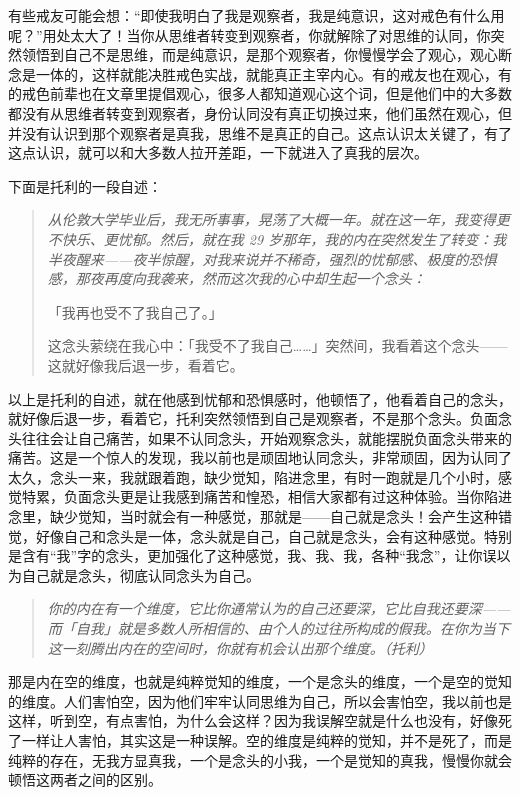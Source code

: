 有些戒友可能会想：“即使我明白了我是观察者，我是纯意识，这对戒色有什么用呢？”用处太大了！当你从思维者转变到观察者，你就解除了对思维的认同，你突然领悟到自己不是思维，而是纯意识，是那个观察者，你慢慢学会了观心，观心断念是一体的，这样就能决胜戒色实战，就能真正主宰内心。有的戒友也在观心，有的戒色前辈也在文章里提倡观心，很多人都知道观心这个词，但是他们中的大多数都没有从思维者转变到观察者，身份认同没有真正切换过来，他们虽然在观心，但并没有认识到那个观察者是真我，思维不是真正的自己。这点认识太关键了，有了这点认识，就可以和大多数人拉开差距，一下就进入了真我的层次。

下面是托利的一段自述：

\begin{quote}\it
    从伦敦大学毕业后，我无所事事，晃荡了大概一年。就在这一年，我变得更不快乐、更忧郁。然后，就在我 29 岁那年，我的内在突然发生了转变：我半夜醒来——夜半惊醒，对我来说并不稀奇，强烈的忧郁感、极度的恐惧感，那夜再度向我袭来，然而这次我的心中却生起一个念头：\begin{center}
        「我再也受不了我自己了。」
    \end{center} 这念头萦绕在我心中：「我受不了我自己……」突然间，我看着这个念头——这就好像我后退一步，看着它。
\end{quote}

以上是托利的自述，就在他感到忧郁和恐惧感时，他顿悟了，他看着自己的念头，就好像后退一步，看着它，托利突然领悟到自己是观察者，不是那个念头。负面念头往往会让自己痛苦，如果不认同念头，开始观察念头，就能摆脱负面念头带来的痛苦。这是一个惊人的发现，我以前也是顽固地认同念头，非常顽固，因为认同了太久，念头一来，我就跟着跑，缺少觉知，陷进念里，有时一跑就是几个小时，感觉特累，负面念头更是让我感到痛苦和惶恐，相信大家都有过这种体验。当你陷进念里，缺少觉知，当时就会有一种感觉，那就是——自己就是念头！会产生这种错觉，好像自己和念头是一体，念头就是自己，自己就是念头，会有这种感觉。特别是含有“我”字的念头，更加强化了这种感觉，我、我、我，各种“我念”，让你误以为自己就是念头，彻底认同念头为自己。

\begin{quote}\it
    你的内在有一个维度，它比你通常认为的自己还要深，它比自我还要深——而「自我」就是多数人所相信的、由个人的过往所构成的假我。在你为当下这一刻腾出内在的空间时，你就有机会认出那个维度。（托利）
\end{quote}

那是内在空的维度，也就是纯粹觉知的维度，一个是念头的维度，一个是空的觉知的维度。人们害怕空，因为他们牢牢认同思维为自己，所以会害怕空，我以前也是这样，听到空，有点害怕，为什么会这样？因为我误解空就是什么也没有，好像死了一样让人害怕，其实这是一种误解。空的维度是纯粹的觉知，并不是死了，而是纯粹的存在，无我方显真我，一个是念头的小我，一个是觉知的真我，慢慢你就会顿悟这两者之间的区别。

